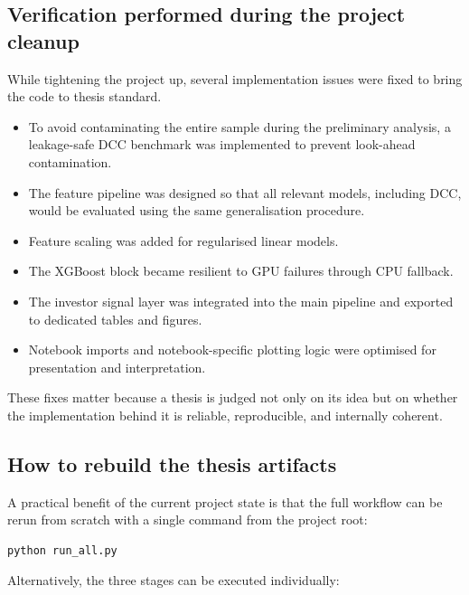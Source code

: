 \subsection{Verification performed during the project cleanup}

While tightening the project up, several implementation issues were fixed to bring the code to thesis standard.

\begin{itemize}
    \item To avoid contaminating the entire sample during the preliminary analysis, a leakage-safe DCC benchmark was implemented to prevent look-ahead contamination.
    \item The feature pipeline was designed so that all relevant models, including DCC, would be evaluated using the same generalisation procedure.
    \item Feature scaling was added for regularised linear models.
    \item The XGBoost block became resilient to GPU failures through CPU fallback.
    \item The investor signal layer was integrated into the main pipeline and exported to dedicated tables and figures.
    \item Notebook imports and notebook-specific plotting logic were optimised for presentation and interpretation.
\end{itemize}

These fixes matter because a thesis is judged not only on its idea but on whether the implementation behind it is reliable, reproducible, and internally coherent.

\subsection{How to rebuild the thesis artifacts}

A practical benefit of the current project state is that the full workflow can be rerun from scratch with a single command from the project root:

\begin{lstlisting}[language={}, aboveskip=4pt, belowskip=4pt, caption={Full rebuild from the project root directory.}, label=lst:rebuild]
python run_all.py
\end{lstlisting}

Alternatively, the three stages can be executed individually:

